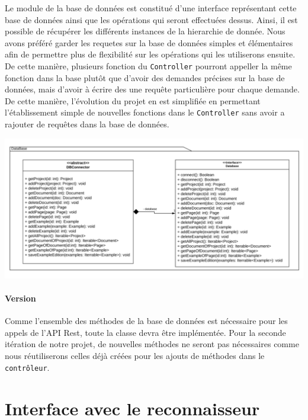 Le module de la base de données est constitué d'une interface représentant cette base de données ainsi que les opérations qui seront effectuées dessus. Ainsi, il est possible de récupérer les différents instances de la hierarchie de donnée. Nous avons préféré garder les requetes sur la base de données simples et élémentaires afin de permettre plus de flexibilité sur les opérations qui les utiliserons ensuite. De cette manière, plusieurs fonction du \texttt{Controller} pourront appeller la même fonction dans la base plutôt que d'avoir des demandes précises sur la base de données, mais d'avoir à écrire des une requête particulière pour chaque demande. De cette manière, l'évolution du projet en est simplifiée en permettant l'établissement simple de nouvelles fonctions dans le \texttt{Controller} sans avoir a rajouter de requêtes dans la base de données.

\newpage
\begin{mdframed}[frametitle={Architecture de la base de données}, innerbottommargin=10]
\begin{center}
\includegraphics[scale=0.5]{assets/UML_Database.pdf}
\end{center}
\end{mdframed}

\paragraph{Version}
Comme l'ensemble des méthodes de la base de données est nécessaire pour les appels de l'API Rest, toute la classe devra être implémentée. Pour la seconde itération de notre projet, de nouvelles méthodes ne seront pas nécessaires comme nous réutiliserons celles déjà créées pour les ajouts de méthodes dans le \texttt{contrôleur}.

\section{Interface avec le reconnaisseur}

